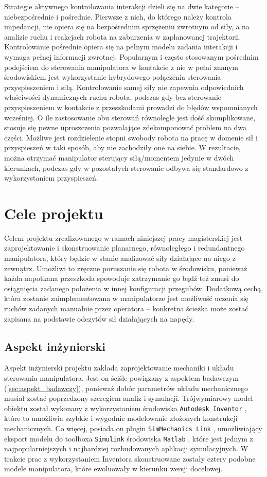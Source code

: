 \documentclass[printmode]{mgr}
\begin{document}
Strategie aktywnego kontrolowania interakcji dzieli się na dwie kategorie -- niebezpośrednie i pośrednie.
Pierwsze z nich, do którego należy kontrola impedancji, nie opiera się na bezpośrednim sprzężeniu zwrotnym od siły, a na analizie ruchu
i reakcjach robota na zaburzenia w zaplanowanej trajektorii. Kontrolowanie pośrednie opiera się na pełnym modelu zadania interakcji
i wymaga pełnej informacji zwrotnej. Popularnym i często stosowanym pośrednim podejściem do sterowania manipulatora w kontakcie z nie w pełni znanym środowiskiem jest wykorzystanie hybrydowego połączenia sterowania przyspieszeniem i siłą. 
Kontrolowanie samej siły nie zapewnia odpowiednich właściwości dynamicznych ruchu
robota, podczas gdy bez sterowanie przyspieszeniem w kontakcie z przeszkodami prowadzi do błędów wspomnianych wcześniej. 
O ile zastosowanie obu sterowań równolegle jest dość skomplikowane, stosuje się pewne uproszczenia pozwalające zdekomponować
problem na dwa części. Możliwe jest rozdzielenie stopni swobody robota na pracę w domenie sił i przyspieszeń w taki sposób,
aby nie zachodziły one na siebie. W rezultacie, można otrzymać manipulator sterujący siłą/momentem jedynie w dwóch kierunkach,
podczas gdy w pozostałych sterowanie odbywa się standardowo z wykorzystaniem przyspieszeń.


\chapter{Cele projektu} \label{ch:cele}
Celem projektu zrealizowanego w ramach niniejszej pracy magisterskiej jest zaprojektowanie i skonstruowanie planarnego, równoległego
i redundantnego manipulatora, który będzie w stanie analizować siły działające na niego z zewnątrz. Umożliwi to 
zręczne poruszanie się robota w środowisku, ponieważ każda napotkana przeszkoda spowoduje zatrzymanie go bądź też zmusi
do osiągnięcia zadanego położenia w innej konfiguracji przegubów. Dodatkową cechą, która zostanie zaimplementowana w manipulatorze
jest możliwość uczenia się ruchów zadanych manualnie przez operatora -- konkretna ścieżka może zostać zapisana na podstawie
odczytów sił działających na napędy. 

\section{Aspekt inżynierski}
Aspekt inżynierski projektu zakłada zaprojektowanie mechaniki i układu sterowania manipulatora. Jest on ściśle powiązany
z aspektem badawczym (\ref{sec:aspekt_badawczy}), ponieważ dobór parametrów układu mechanicznego musiał zostać poprzedzony
szeregiem analiz i symulacji. Trójwymiarowy model obiektu został wykonany z wykorzystaniem środowiska \texttt{Autodesk Inventor} \cite{autodesk},
które to umożliwia szybkie i wygodnie modelowanie złożonych konstrukcji mechanicznych. Co więcej, posiada on plugin
\texttt{SimMechanics Link} \cite{simmechanics_link}, umożliwiający eksport modelu do toolboxa \texttt{Simulink} środowiska 
\texttt{Matlab} \cite{mathworks}, które jest jednym z najpopularniejszych i najbardziej rozbudowanych aplikacji symulacyjnych.
W trakcie prac z wykorzystaniem Inventora skonstruowane zostały cztery podobne modele manipulatora, które ewoluowały 
w kierunku wersji docelowej. 
\end{document}
